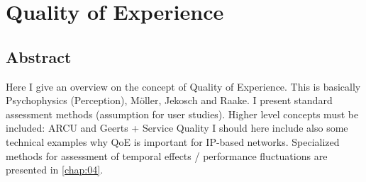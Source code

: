 \chapter{Quality of Experience}
\section*{Abstract}
Here I give an overview on the concept of Quality of Experience.
This is basically Psychophysics (Perception), Möller, Jekosch and Raake.
I present standard assessment methods (assumption for user studies).
Higher level concepts must be included: ARCU and Geerts + Service Quality
I should here include also some technical examples why QoE is important for IP-based networks.
Specialized methods for assessment of temporal effects / performance fluctuations are presented in \ref{chap:04}.

